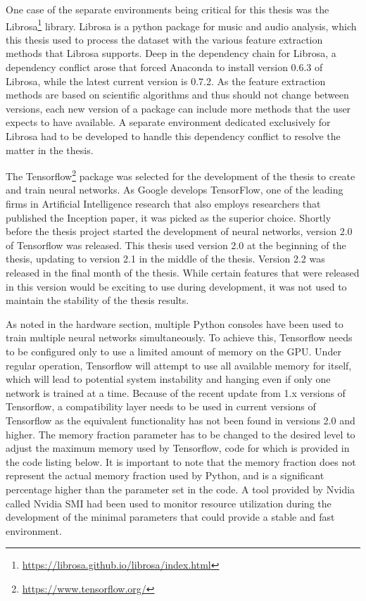 One case of the separate environments being critical for this thesis was the Librosa\footnote{\url{https://librosa.github.io/librosa/index.html}} library.
Librosa is a python package for music and audio analysis, which this thesis used to process the dataset with the various feature extraction methods that Librosa supports.
Deep in the dependency chain for Librosa, a dependency conflict arose that forced Anaconda to install version 0.6.3 of Librosa, while the latest current version is 0.7.2.
As the feature extraction methods are based on scientific algorithms and thus should not change between versions, each new version of a package can include more methods that the user expects to have available.
A separate environment dedicated exclusively for Librosa had to be developed to handle this dependency conflict to resolve the matter in the thesis.


The Tensorflow\footnote{\url{https://www.tensorflow.org/}} package was selected for the development of the thesis to create and train neural networks.
As Google develops TensorFlow, one of the leading firms in Artificial Intelligence research that also employs researchers that published the Inception paper\cite{szegedy2014going}, it was picked as the superior choice.
Shortly before the thesis project started the development of neural networks, version 2.0 of Tensorflow was released.
This thesis used version 2.0 at the beginning of the thesis, updating to version 2.1 in the middle of the thesis.
Version 2.2 was released in the final month of the thesis. 
While certain features that were released in this version would be exciting to use during development, it was not used to maintain the stability of the thesis results.

As noted in the hardware section, multiple Python consoles have been used to train multiple neural networks simultaneously.
To achieve this, Tensorflow needs to be configured only to use a limited amount of memory on the GPU.
Under regular operation, Tensorflow will attempt to use all available memory for itself, which will lead to potential system instability and hanging even if only one network is trained at a time.
Because of the recent update from 1.x versions of Tensorflow, a compatibility layer needs to be used in current versions of Tensorflow as the equivalent functionality has not been found in versions 2.0 and higher.
The memory fraction parameter has to be changed to the desired level to adjust the maximum memory used by Tensorflow, code for which is provided in the code listing below.
It is important to note that the memory fraction does not represent the actual memory fraction used by Python, and is a significant percentage higher than the parameter set in the code.
A tool provided by Nvidia called Nvidia SMI had been used to monitor resource utilization during the development of the minimal parameters that could provide a stable and fast environment.


